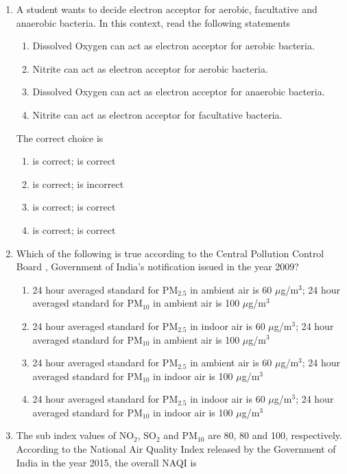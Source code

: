 \documentclass[journal,12pt,onecolumn]{IEEEtran}
\theoremstyle{remark}
\begin{document}
\begin{enumerate}
\item A student wants to decide electron acceptor for aerobic, facultative and anaerobic bacteria. In this context, read the following statements

\begin{enumerate}[label=\roman*.]
\item Dissolved Oxygen  can act as electron acceptor for aerobic bacteria.
\item Nitrite can act as electron acceptor for aerobic bacteria.
\item Dissolved Oxygen  can act as electron acceptor for anaerobic bacteria.
\item Nitrite can act as electron acceptor for facultative bacteria.
\end{enumerate}

The correct choice is

\begin{enumerate}
\item {} is correct;  is correct
\item {} is correct;  is incorrect
\item {} is correct;  is correct
\item {} is correct;  is correct
\end{enumerate}
\hfill{}

\newpage

\item Which of the following is true according to the Central Pollution Control Board , Government of India's notification issued in the year 2009?

\begin{enumerate}
\item 24 hour averaged standard for PM$_{2.5}$ in ambient air is 60 $\mu$g/m$^3$; 24 hour averaged standard for PM$_{10}$ in ambient air is 100 $\mu$g/m$^3$
\item 24 hour averaged standard for PM$_{2.5}$ in indoor air is 60 $\mu$g/m$^3$; 24 hour averaged standard for PM$_{10}$ in ambient air is 100 $\mu$g/m$^3$
\item 24 hour averaged standard for PM$_{2.5}$ in ambient air is 60 $\mu$g/m$^3$; 24 hour averaged standard for PM$_{10}$ in indoor air is 100 $\mu$g/m$^3$
\item 24 hour averaged standard for PM$_{2.5}$ in indoor air is 60 $\mu$g/m$^3$; 24 hour averaged standard for PM$_{10}$ in indoor air is 100 $\mu$g/m$^3$
\end{enumerate}
\hfill{}
\item The sub index values of NO$_2$, SO$_2$ and PM$_{10}$ are 80, 80 and 100, respectively. According to the National Air Quality Index  released by the Government of India in the year 2015, the overall NAQI is


\end{enumerate}
\end{document}
